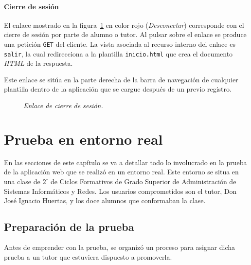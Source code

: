\documentclass[a4paper, 12pt]{book}
\begin{document}
\subsubsection{Cierre de sesi\'on} 
\label{sec:cierresesion}
El enlace mostrado en la figura~\ref{fig:cierresesion} en color rojo (\textit{Desconectar}) corresponde con el cierre de sesi\'on por parte de alumno o 
tutor. Al pulsar sobre el enlace se produce una petici\'on \texttt{GET} del cliente. La vista asociada al recurso interno del enlace es \texttt{salir}, la cual 
redirecciona a la plantilla \texttt{inicio.html} que crea el documento \textit{HTML} de la respuesta.

Este enlace se sit\'ua en la parte derecha de la barra de navegaci\'on de cualquier plantilla dentro de la aplicaci\'on que se cargue despu\'es de un previo
registro.
\begin{figure}
  \centering
  \caption{\textit{Enlace de cierre de sesi\'on.}}
  \label{fig:cierresesion}
\end{figure}



\cleardoublepage
\chapter{Prueba en entorno real}
\label{chap:prueba}
En las secciones de este cap\'itulo se va a detallar todo lo involucrado en la prueba de la aplicaci\'on web que se realiz\'o en un entorno real. Este 
entorno se situa en una clase de $2^\circ$ de Ciclos Formativos de Grado Superior de Administraci\'on de Sistemas Inform\'aticos y Redes. Los usuarios 
comprometidos son el tutor, Don Jos\'e Ignacio Huertas, y los doce alumnos que conformaban la clase.

\section{Preparaci\'on de la prueba}
\label{seccion:preparacionprueba}
Antes de emprender con la prueba, se organiz\'o un proceso para asignar dicha prueba a un tutor que estuviera dispuesto a promoverla.
\end{document}
